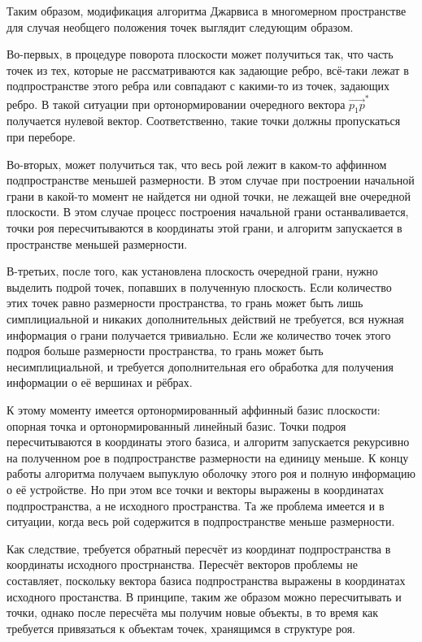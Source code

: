\documentclass[14pt]{extarticle}
\begin{document}
Таким образом, модификация алгоритма Джарвиса в многомерном пространстве для случая необщего положения точек выглядит следующим образом.

Во-первых, в процедуре поворота плоскости может получиться так, что часть точек из тех, которые не рассматриваются как задающие ребро, всё-таки лежат в подпространстве этого ребра или совпадают с какими-то из точек, задающих ребро. В такой ситуации при ортонормировании очередного вектора $\overrightarrow{p_1p}^*$ получается нулевой вектор. Соответственно, такие точки должны пропускаться при переборе.

Во-вторых, может получиться так, что весь рой лежит в каком-то аффинном подпространстве меньшей размерности. В этом случае при построении начальной грани в какой-то момент не найдется ни одной точки, не лежащей вне очередной плоскости. В этом случае процесс построения начальной грани останваливается, точки роя пересчитываются в координаты этой грани, и алгоритм запускается в пространстве меньшей размерности.

В-третьих, после того, как установлена плоскость очередной грани, нужно выделить подрой точек, попавших в полученную плоскость. Если количество этих точек равно размерности пространства, то грань может быть лишь симплициальной и никаких дополнительных действий не требуется, вся нужная информация о грани получается тривиально. Если же количество точек этого подроя больше размерности пространства, то грань может быть несимплициальной, и требуется дополнительная его обработка для получения информации о её вершинах и рёбрах.

К этому моменту имеется ортонормированный аффинный базис плоскости: опорная точка и ортонормированный линейный базис. Точки подроя пересчитываются в координаты этого базиса, и алгоритм запускается рекурсивно на полученном рое в подпространстве размерности на единицу меньше. К концу работы алгоритма получаем выпуклую оболочку этого роя и полную информацию о её устройстве. Но при этом все точки и векторы выражены в координатах подпространства, а не исходного пространства. Та же проблема имеется и в ситуации, когда весь рой содержится в подпространстве меньше размерности.

Как следствие, требуется обратный пересчёт из координат подпространства в координаты исходного прострнанства. Пересчёт векторов проблемы не составляет, поскольку вектора базиса подпространства выражены в координатах исходного простанства. В принципе, таким же образом можно пересчитывать и точки, однако после пересчёта мы получим новые объекты, в то время как требуется привязаться к объектам точек, хранящимся в структуре роя.
\end{document}
